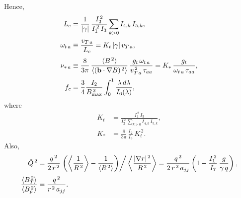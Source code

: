 \documentclass[notitlepage,12pt]{article}
\begin{document}
Hence,
\begin{align}
L_c &= \frac{1}{|\gamma|}\,\frac{I_2^{\,2}}{I_1^{\,2}\,I_3}\sum_{k>0}
I_{4,k}\,I_{5,k},\\[0.5ex]
\omega_{t\,a}&\equiv \frac{v_{T\,a}}{L_c} = K_{t}\,|\gamma|\,v_{T\,a},\\[0.5ex]
\nu_{\ast\,a} &\equiv \frac{8}{3\pi}\,\frac{\langle B^{\,2}\rangle}{\langle
({\bf b}\cdot\nabla B)^{\,2}\rangle}\,\frac{g_t\,\omega_{t\,a}}{v_{T\,a}^{\,2}\,\tau_{aa}}= K_{\ast}\,\frac{g_t}{\omega_{t\,a}\,\tau_{aa}},\\[0.5ex]
f_c &=\frac{3}{4} \frac{I_2}{B_{\rm max}^{\,2}}\int_0^{1}\frac{\lambda\,d\lambda}{I_6(\lambda)},
\end{align}
where 
\begin{align}
K_{t} &= \frac{I_1^{\,2}\,I_3}{I_2^{\,2}\,\sum_{k>0}I_{4,k}\,I_{5,k}},\\[0.5ex]
K_{\ast}&= \frac{8}{3\pi}\,\frac{I_2}{I_3}\,K_{t}^{\,2}.
\end{align}
Also,
\begin{align}
\hat{Q}^{\,2} &= \frac{q^{\,2}}{2\,r^{\,2}}\left.\left(\left\langle \frac{1}{R^{\,2}}\right\rangle - \frac{1}{\langle R^{\,2}\rangle}\right)\right/\left\langle\frac{|\nabla r|^{\,2}}{R^{\,2}}\right\rangle = \frac{q^{\,2}}{2\,r^{\,2}\,a_{jj}}\left(
1-\frac{I_1^{\,2}}{I_7}\,\frac{g}{\gamma\,q}\right),\\[0.5ex]
\frac{\langle B_T^{\,2}\rangle}{\langle B_p^{\,2}\rangle}&= \frac{q^{\,2}}{r^{\,2}\,a_{jj}}.
\end{align}
\end{document}
